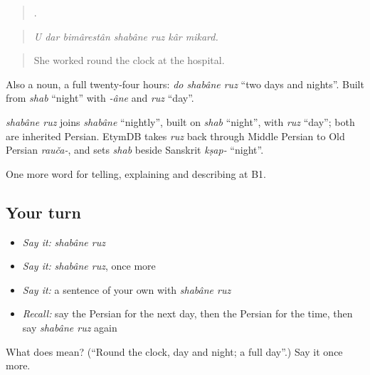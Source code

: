 \begin{quote}
      .
\end{quote}

\begin{quote}
\emph{U dar bimârestân shabâne ruz kâr mikard.}
\end{quote}

\begin{quote}
She worked round the clock at the hospital.
\end{quote}

Also a noun, a full twenty-four hours: \emph{do shabâne ruz} \textquotedblleft{}two days and nights\textquotedblright{}. Built from \emph{shab} \textquotedblleft{}night\textquotedblright{} with \emph{-âne} and \emph{ruz} \textquotedblleft{}day\textquotedblright{}.

\begin{cousinweb}
\emph{shabâne ruz} joins \emph{shabâne} \textquotedblleft{}nightly\textquotedblright{}, built on \emph{shab} \textquotedblleft{}night\textquotedblright{}, with \emph{ruz} \textquotedblleft{}day\textquotedblright{}; both are inherited Persian. EtymDB takes \emph{ruz} back through Middle Persian to Old Persian \emph{rauča-}, and sets \emph{shab} beside Sanskrit \emph{kṣap-} \textquotedblleft{}night\textquotedblright{}.
\end{cousinweb}

\begin{grammarlens}[title={What you've built}]
One more word for telling, explaining and describing at B1.
\end{grammarlens}

\subsection*{Your turn}
\begin{itemize}
\raggedright
  \item \emph{Say it:} \emph{shabâne ruz}
  \item \emph{Say it:} \emph{shabâne ruz}, once more
  \item \emph{Say it:} a sentence of your own with \emph{shabâne ruz}
  \item \emph{Recall:} say the Persian for the next day, then the Persian for the time, then say \emph{shabâne ruz} again
\end{itemize}

\begin{tcolorbox}[breakable,colback=teal!4,colframe=teal!35!black,title={Before you move on}]
What does   mean? (\textquotedblleft{}Round the clock, day and night; a full day\textquotedblright{}.) Say it once more.
\end{tcolorbox}

